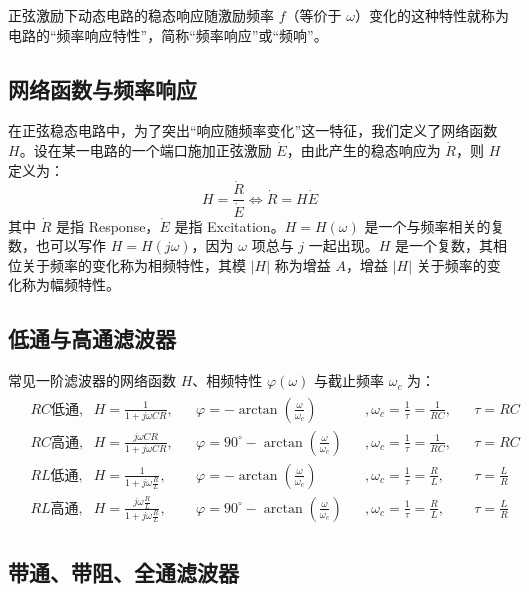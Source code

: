 \documentclass[UTF8]{report}
\theoremstyle{MyLineTheoremStyle} %
\theoremstyle{MyBlockTheoremStyle} %
\theoremstyle{MySubsubsectionStyle} %
\begin{document}
正弦激励下动态电路的稳态响应随激励频率 $f$（等价于 $\omega$）变化的这种特性就称为电路的“频率响应特性”，简称“频率响应”或“频响”。

\subsection{网络函数与频率响应}
在正弦稳态电路中，为了突出“响应随频率变化”这一特征，我们定义了网络函数 $H$。设在某一电路的一个端口施加正弦激励 $\dot{E}$，由此产生的稳态响应为 $\dot{R}$，则 $H$ 定义为：
\begin{equation}
H = \frac{\dot{R}}{\dot{E}} \Longleftrightarrow \dot{R} = H \dot{E}
\end{equation}
其中 $\dot{R}$ 是指 Response，$\dot{E}$ 是指 Excitation。$H = H(\omega)$ 是一个与频率相关的复数，也可以写作 $H = H(j\omega)$，因为 $\omega$ 项总与 $j$ 一起出现。$H$ 是一个复数，其相位关于频率的变化称为相频特性，其模 $|H|$ 称为增益 $A$，增益 $|H|$ 关于频率的变化称为幅频特性。

\subsection{低通与高通滤波器}
常见一阶滤波器的网络函数 $H$、相频特性 $\varphi(\omega)$ 与截止频率 $\omega_c$ 为：
\begin{align}
\begin{aligned}
&RC \text{低通}, && H = \frac{1}{1 + j \omega CR}, && \varphi = - \arctan \left(\frac{\omega}{\omega_c}\right) &&, \omega_c = \frac{1}{\tau} = \frac{1}{RC}, && \tau = RC\\
&RC \text{高通}, && H = \frac{j \omega CR}{1 + j \omega CR}, && \varphi = 90^\circ - \arctan \left(\frac{\omega}{\omega_c}\right) &&, \omega_c = \frac{1}{\tau} = \frac{1}{RC}, && \tau = RC\\
&RL \text{低通}, && H = \frac{1}{1 + j \omega \frac{R}{L}}, && \varphi = - \arctan \left(\frac{\omega}{\omega_c}\right) &&, \omega_c = \frac{1}{\tau} = \frac{R}{L}, && \tau = \frac{L}{R}\\
&RL \text{高通}, && H = \frac{j \omega \frac{R}{L}}{1 + j \omega \frac{R}{L}}, && \varphi = 90^\circ - \arctan \left(\frac{\omega}{\omega_c}\right) &&, \omega_c = \frac{1}{\tau} = \frac{R}{L}, && \tau = \frac{L}{R}
\end{aligned}
\end{align}

\subsection{带通、带阻、全通滤波器}
\end{document}
